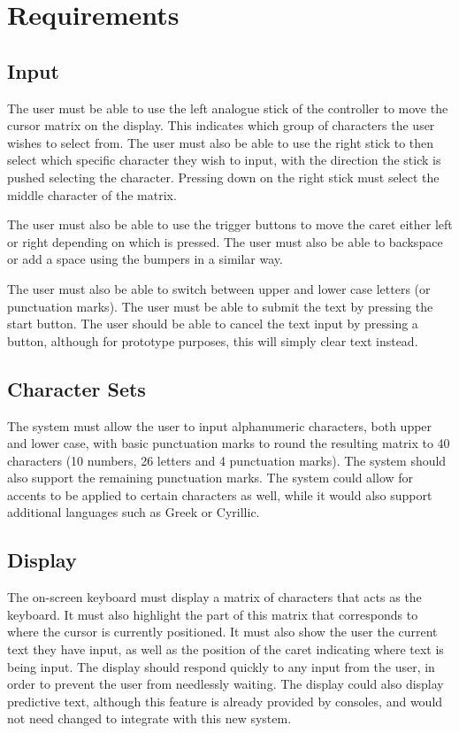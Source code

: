 \documentclass[requirements.tex]{subfiles}
\begin{document}
\section{Requirements} %
\label{sec:requirements}

\subsection{Input} %
\label{sub:input}
The user must be able to use the left analogue stick of the controller to move
the cursor matrix on the display. This indicates which group of characters the
user wishes to select from. The user must also be able to use the right stick to
then select which specific character they wish to input, with the direction the
stick is pushed selecting the character. Pressing down on the right stick must
select the middle character of the matrix.

The user must also be able to use the trigger buttons to move the caret either
left or right depending on which is pressed. The user must also be able to
backspace or add a space using the bumpers in a similar way.

The user must also be able to switch between upper and lower case letters (or
punctuation marks). The user must be able to submit the text by pressing the
start button. The user should be able to cancel the text input by pressing a
button, although for prototype purposes, this will simply clear text instead.

\subsection{Character Sets} %
\label{sub:character_sets}
The system must allow the user to input alphanumeric characters, both upper and
lower case, with basic punctuation marks to round the resulting matrix to 40
characters (10 numbers, 26 letters and 4 punctuation marks). The system should
also support the remaining punctuation marks. The system could allow for accents
to be applied to certain characters as well, while it would also support
additional languages such as Greek or Cyrillic.

\subsection{Display} %
\label{sub:display}
The on-screen keyboard must display a matrix of characters that acts as the
keyboard. It must also highlight the part of this matrix that corresponds to
where the cursor is currently positioned. It must also show the user the current
text they have input, as well as the position of the caret indicating where text
is being input. The display should respond quickly to any input from the user,
in order to prevent the user from needlessly waiting. The display could also
display predictive text, although this feature is already provided by consoles,
and would not need changed to integrate with this new system.
\newpage
\end{document}
